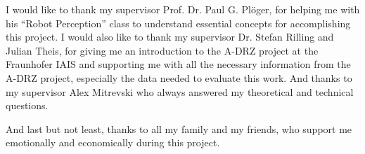 




    \begin{acknowledgements}
        I would like to thank my supervisor Prof. Dr. Paul G. Plöger, for helping me with his “Robot Perception” class 
        to understand essential concepts for accomplishing this project. 
        I would also like to thank my supervisor Dr. Stefan Rilling and Julian Theis, 
        for giving me an introduction to the A-DRZ project at the Fraunhofer IAIS and 
        supporting me with all the necessary information from the A-DRZ project, especially the data needed to evaluate this work. 
        And thanks to my supervisor Alex Mitrevski who always answered my theoretical and technical questions.

        And last but not least, thanks to all my family and my friends, who support me emotionally and economically during this project.

    \end{acknowledgements}

